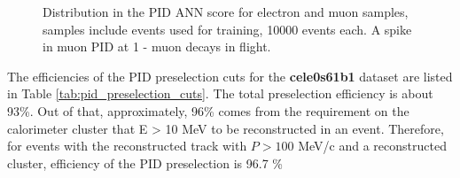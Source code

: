 \begin{figure}[H]
  \caption{
    \label{fig:pid_training_4}
    Distribution in the PID ANN score for electron and muon samples, samples include events used for training,
    10000 events each. A spike in muon PID at 1  - muon decays in flight. \\ 
  }
\end{figure}

The efficiencies of the PID preselection cuts for the {\bf cele0s61b1} dataset are listed
in Table \ref{tab:pid_preselection_cuts}. The total preselection efficiency is about 93\%.
%
Out of that, approximately, 96\% comes from the requirement on the calorimeter cluster that E > 10 MeV
to be reconstructed in an event. Therefore, for events with the reconstructed track with $P > 100$ MeV/c 
and a reconstructed cluster, efficiency of the PID preselection is 96.7 \%


